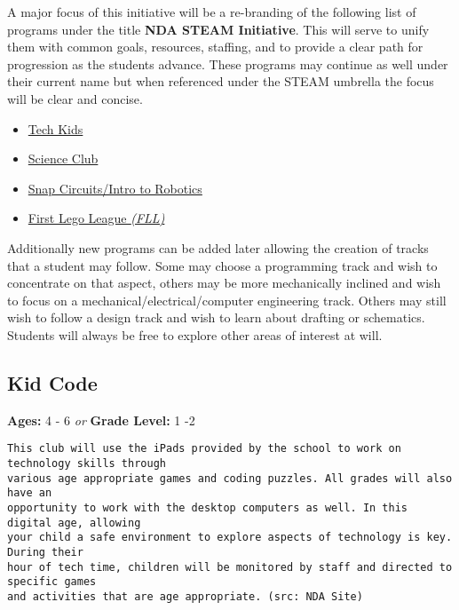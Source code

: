 \documentclass{article}
\begin{document}
A major focus of this initiative will be a re-branding of the following list of programs under the title \textbf{NDA STEAM Initiative}. This will serve to unify them with common goals, resources, staffing, and to provide a clear path for progression as the students advance. These programs may continue as well under their current name but when referenced under the STEAM umbrella the focus will be clear and concise.

\begin{itemize}
  \item \href{http://www.ndatyngsboro.org/activities-camp/tech-kids}{Tech Kids}
  \item \href{http://www.ndatyngsboro.org/activities-camp/science-club}{Science Club}
  \item \href{http://www.ndatyngsboro.org/activities-camp/snap-circuits}{Snap Circuits/Intro to Robotics}
  \item \href{http://www.ndatyngsboro.org/activities-camp/first-lego}{First Lego League \textit{(FLL)}}
\end{itemize}

Additionally new programs can be added later allowing the creation of tracks that a student may follow. Some may choose a programming track and wish to concentrate on that aspect, others may be more mechanically inclined and wish to focus on a mechanical/electrical/computer engineering track. Others may still wish to follow a design track and wish to learn about drafting or schematics. Students will always be free to explore other areas of interest at will.

\subsection*{Kid Code}
\textbf{Ages:} 4 - 6 \textit{or} \textbf{Grade Level:} 1 -2
\begingroup
    \fontsize{10pt}{12pt}\selectfont
    \begin{verbatim} 
This club will use the iPads provided by the school to work on technology skills through
various age appropriate games and coding puzzles. All grades will also have an 
opportunity to work with the desktop computers as well. In this digital age, allowing 
your child a safe environment to explore aspects of technology is key. During their 
hour of tech time, children will be monitored by staff and directed to specific games 
and activities that are age appropriate. (src: NDA Site)
    \end{verbatim} 
\endgroup
\end{document}
